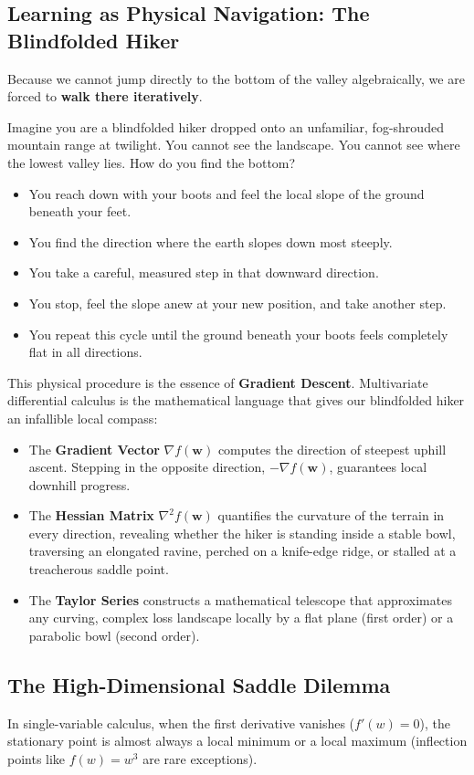 \subsection{Learning as Physical Navigation: The Blindfolded Hiker}
Because we cannot jump directly to the bottom of the valley algebraically, we are forced to \textbf{walk there iteratively}. 

Imagine you are a blindfolded hiker dropped onto an unfamiliar, fog-shrouded mountain range at twilight. You cannot see the landscape. You cannot see where the lowest valley lies. How do you find the bottom?
\begin{itemize}
    \item You reach down with your boots and feel the local slope of the ground beneath your feet.
    \item You find the direction where the earth slopes down most steeply.
    \item You take a careful, measured step in that downward direction.
    \item You stop, feel the slope anew at your new position, and take another step.
    \item You repeat this cycle until the ground beneath your boots feels completely flat in all directions.
\end{itemize}
This physical procedure is the essence of \textbf{Gradient Descent}. Multivariate differential calculus is the mathematical language that gives our blindfolded hiker an infallible local compass:
\begin{itemize}
    \item The \textbf{Gradient Vector} $\nabla f(\mathbf{w})$ computes the direction of steepest uphill ascent. Stepping in the opposite direction, $-\nabla f(\mathbf{w})$, guarantees local downhill progress.
    \item The \textbf{Hessian Matrix} $\nabla^2 f(\mathbf{w})$ quantifies the curvature of the terrain in every direction, revealing whether the hiker is standing inside a stable bowl, traversing an elongated ravine, perched on a knife-edge ridge, or stalled at a treacherous saddle point.
    \item The \textbf{Taylor Series} constructs a mathematical telescope that approximates any curving, complex loss landscape locally by a flat plane (first order) or a parabolic bowl (second order).
\end{itemize}

\subsection{The High-Dimensional Saddle Dilemma}
In single-variable calculus, when the first derivative vanishes ($f'(w) = 0$), the stationary point is almost always a local minimum or a local maximum (inflection points like $f(w) = w^3$ are rare exceptions).

